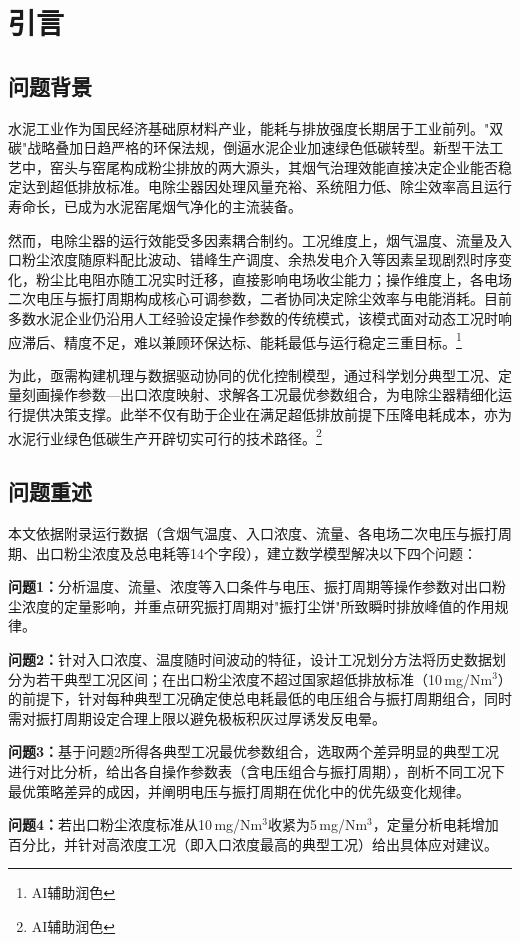
\section{引言}
\subsection{问题背景}
水泥工业作为国民经济基础原材料产业，能耗与排放强度长期居于工业前列。"双碳"战略叠加日趋严格的环保法规，倒逼水泥企业加速绿色低碳转型。新型干法工艺中，窑头与窑尾构成粉尘排放的两大源头，其烟气治理效能直接决定企业能否稳定达到超低排放标准。电除尘器因处理风量充裕、系统阻力低、除尘效率高且运行寿命长\cite{parker1997}，已成为水泥窑尾烟气净化的主流装备。

然而，电除尘器的运行效能受多因素耦合制约。工况维度上，烟气温度、流量及入口粉尘浓度随原料配比波动、错峰生产调度、余热发电介入等因素呈现剧烈时序变化，粉尘比电阻亦随工况实时迁移，直接影响电场收尘能力；操作维度上，各电场二次电压与振打周期构成核心可调参数，二者协同决定除尘效率与电能消耗。目前多数水泥企业仍沿用人工经验设定操作参数的传统模式，该模式面对动态工况时响应滞后、精度不足，难以兼顾环保达标、能耗最低与运行稳定三重目标。\footnote{AI辅助润色}

为此，亟需构建机理与数据驱动协同的优化控制模型，通过科学划分典型工况、定量刻画操作参数—出口浓度映射、求解各工况最优参数组合，为电除尘器精细化运行提供决策支撑。此举不仅有助于企业在满足超低排放前提下压降电耗成本，亦为水泥行业绿色低碳生产开辟切实可行的技术路径。\footnote{AI辅助润色}


\subsection{问题重述}
本文依据附录运行数据（含烟气温度、入口浓度、流量、各电场二次电压与振打周期、出口粉尘浓度及总电耗等14个字段），建立数学模型解决以下四个问题：

\textbf{问题1：}分析温度、流量、浓度等入口条件与电压、振打周期等操作参数对出口粉尘浓度的定量影响，并重点研究振打周期对"振打尘饼"所致瞬时排放峰值的作用规律。

\textbf{问题2：}针对入口浓度、温度随时间波动的特征，设计工况划分方法将历史数据划分为若干典型工况区间；在出口粉尘浓度不超过国家超低排放标准（10\,mg/Nm$^3$）的前提下，针对每种典型工况确定使总电耗最低的电压组合与振打周期组合，同时需对振打周期设定合理上限以避免极板积灰过厚诱发反电晕。

\textbf{问题3：}基于问题2所得各典型工况最优参数组合，选取两个差异明显的典型工况进行对比分析，给出各自操作参数表（含电压组合与振打周期），剖析不同工况下最优策略差异的成因，并阐明电压与振打周期在优化中的优先级变化规律。

\textbf{问题4：}若出口粉尘浓度标准从10\,mg/Nm$^3$收紧为5\,mg/Nm$^3$，定量分析电耗增加百分比，并针对高浓度工况（即入口浓度最高的典型工况）给出具体应对建议。
